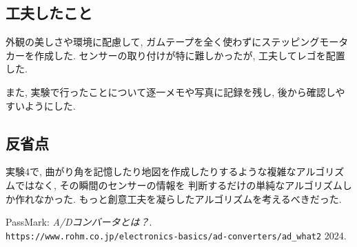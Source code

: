 \documentclass{ltjsarticle} %
\begin{document}
\subsection{工夫したこと}
外観の美しさや環境に配慮して, ガムテープを全く使わずにステッピングモータカーを作成した. 
センサーの取り付けが特に難しかったが, 工夫してレゴを配置した. 

また, 実験で行ったことについて逐一メモや写真に記録を残し, 後から確認しやすいようにした. 

\subsection{反省点}
実験4で, 曲がり角を記憶したり地図を作成したりするような複雑なアルゴリズムではなく, その瞬間のセンサーの情報を
判断するだけの単純なアルゴリズムしか作れなかった. 
もっと創意工夫を凝らしたアルゴリズムを考えるべきだった. 


\begin{thebibliography}{99} %
    
  PassMark: 
  \emph{A/Dコンバータとは？}. \\
  \verb|https://www.rohm.co.jp/electronics-basics/ad-converters/ad_what2|  2024.

\end{thebibliography}
\end{document}
